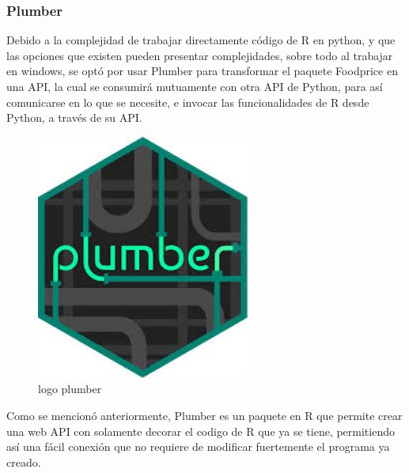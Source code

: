 \subsubsection{Plumber}
\noindent Debido a la complejidad de trabajar directamente c\'odigo de R en python, y que las opciones que existen pueden presentar complejidades, sobre todo al trabajar en windows, se opt\'o por usar Plumber para transformar el paquete Foodprice en una API, la cual se consumir\'a mutuamente con otra API de Python, para as\'i comunicarse en lo que se necesite, e invocar las funcionalidades de R desde Python, a  trav\'es de su API. 

\begin{figure}[H]
        \centering
        \includegraphics[width=7cm]{img/metodologia/plumber.jpeg}
        \caption{logo plumber}
        \label{fig:logoPlumber}
    \end{figure}

Como se mencion\'o anteriormente, Plumber es un paquete en R que permite crear una web API con solamente decorar el codigo de R que ya se tiene, permitiendo as\'i una f\'acil conexi\'on que no requiere de modificar fuertemente el programa ya creado\cite{APIGenerator}.


